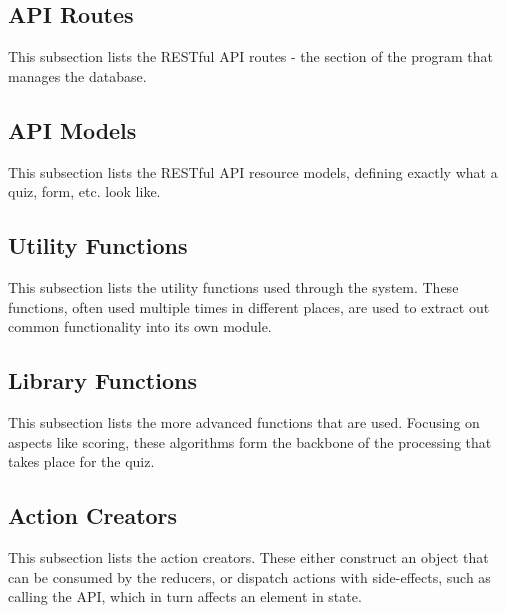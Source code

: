 \subsection{API Routes} %
\label{sub:api_routes}
This subsection lists the RESTful API routes - the section of the program that manages the database.


\subsection{API Models} %
\label{sub:api_models}
This subsection lists the RESTful API resource models, defining exactly what a quiz, form, etc. look like.


\subsection{Utility Functions} %
\label{sub:utility_functions}
This subsection lists the utility functions used through the system. These functions, often used multiple times in different places, are used to extract out common functionality into its own module.


\subsection{Library Functions} %
\label{sub:library_functions}
This subsection lists the more advanced functions that are used. Focusing on aspects like scoring, these algorithms form the backbone of the processing that takes place for the quiz.


\subsection{Action Creators} %
\label{sub:action_creators}
This subsection lists the action creators. These either construct an object that can be consumed by the reducers, or dispatch actions with side-effects, such as calling the API, which in turn affects an element in state.


